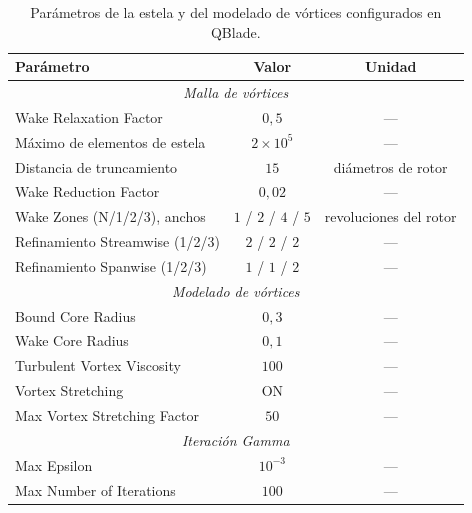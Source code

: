 \begin{table}[H]
    \centering
    \caption{Parámetros de la estela y del modelado de vórtices configurados en QBlade.}
    \label{tab:parametros_estela}
    \begin{tabular}{lcc}
        \hline
        \textbf{Parámetro} & \textbf{Valor} & \textbf{Unidad} \\
        \hline
        \multicolumn{3}{c}{\textit{Malla de vórtices}} \\
        \hline
        Wake Relaxation Factor & $0{,}5$ & — \\
        Máximo de elementos de estela & $2 \times 10^5$ & — \\
        Distancia de truncamiento & $15$ & diámetros de rotor \\
        Wake Reduction Factor & $0{,}02$ & — \\
        Wake Zones (N/1/2/3), anchos & $1$ / $2$ / $4$ / $5$ & revoluciones del rotor \\
        Refinamiento Streamwise (1/2/3) & $2$ / $2$ / $2$ & — \\
        Refinamiento Spanwise (1/2/3) & $1$ / $1$ / $2$ & — \\
        \hline
        \multicolumn{3}{c}{\textit{Modelado de vórtices}} \\
        \hline
        Bound Core Radius & $0{,}3$ & — \\
        Wake Core Radius & $0{,}1$ & — \\
        Turbulent Vortex Viscosity & $100$ & — \\
        Vortex Stretching & ON & — \\
        Max Vortex Stretching Factor & $50$ & — \\
        \hline
        \multicolumn{3}{c}{\textit{Iteración Gamma}} \\
        \hline
        Max Epsilon & $10^{-3}$ & — \\
        Max Number of Iterations & $100$ & — \\
        \hline
    \end{tabular}
\end{table}

